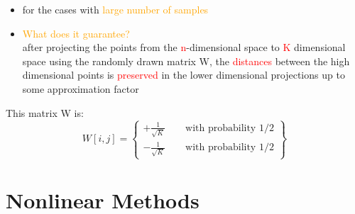 \documentclass[10pt]{beamer}
\begin{document}
	\begin{itemize}
	\item for the cases with \textcolor{orange}{large number of samples} 
    \item {\textcolor{orange}{What does it guarantee?} \\
    after projecting the points from the \textcolor{red}{n}-dimensional space to \textcolor{red}{K} dimensional space using the randomly drawn matrix W, the \textcolor{red}{distances} between the high dimensional points is \textcolor{red}{preserved} in the lower dimensional projections up to some approximation factor}
	\end{itemize}
This matrix W is:
\[
W[i,j] = \left\{
				\begin{array}{ll}
				+\frac{1}{\sqrt{K}} \qquad \text{with probability 1/2}\\
                -\frac{1}{\sqrt{K}} \qquad \text{with probability 1/2}
				\end{array}
         \right \}
  \]      


\section{Nonlinear Methods}
\end{document}
